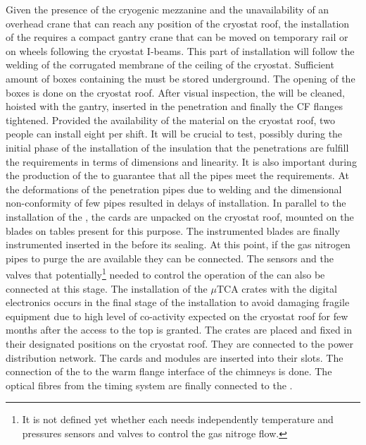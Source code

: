 Given the presence of the cryogenic mezzanine and the unavailability of an overhead crane that can reach any position of the cryostat roof, the installation of the  requires a compact gantry crane that can be moved on temporary rail or on wheels following the cryostat I-beams.
This part of installation will follow the welding of the corrugated membrane of the ceiling of the cryostat.
Sufficient amount of boxes containing the  must be stored underground.
The opening of the boxes is done on the cryostat roof.
After visual inspection, the  will be cleaned, hoisted with the gantry, inserted in the penetration and finally the CF flanges tightened.
Provided the availability of the material on the cryostat roof, two people can install eight  per shift. 
It will be crucial to test, possibly during the initial phase of the installation of the insulation that the penetrations are fulfill the requirements in terms of dimensions and linearity.
It is also important during the production of the  to guarantee that all the pipes meet the requirements.
At  the deformations of the penetration pipes due to welding and the dimensional non-conformity of few  pipes resulted in delays of installation.
In parallel to the installation of the , the  cards are unpacked on the cryostat roof, mounted on the blades on tables present for this purpose.
The instrumented blades are finally instrumented inserted in the  before its sealing.
At this point, if the gas nitrogen pipes to purge the  are available they can be connected.
The sensors and the valves that potentially\footnote{It is not defined yet whether each  needs independently temperature and pressures sensors and valves to control the gas nitroge flow.} needed to control the operation of the  can also be connected at this stage.
The installation of the $\mu$TCA crates with the digital electronics occurs in the final stage of the  installation to avoid damaging fragile equipment due to high level of co-activity expected on the cryostat roof for few months after the access to the top is granted.
The crates are placed and fixed in their designated positions on the cryostat roof.
They are connected to the power distribution network.
The  cards and  modules are inserted into their slots.
The connection of the   to the warm flange interface of the  chimneys is done.
The optical fibres from the timing system are finally connected to the .

